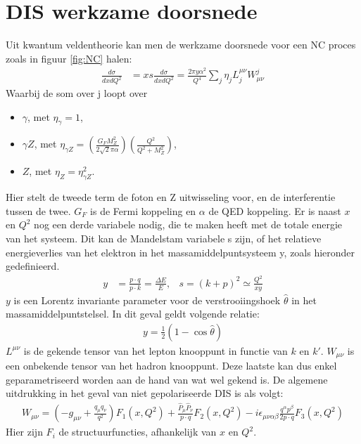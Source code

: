 \documentclass[a4paper,11pt]{article}
\numberwithin{equation}{section} %
\begin{document}
\section{DIS werkzame doorsnede} \label{app:SF}
Uit kwantum veldentheorie kan men de werkzame doorsnede voor een NC proces zoals in figuur \ref{fig:NC} halen:
\begin{align}
\frac{d\sigma}{dxdQ^2} &= xs \frac{d\sigma}{dxdQ^2} = \frac{2\pi y \alpha^2}{Q^4} \sum_j \eta_j L_j^{\mu \nu} W_{\mu \nu}^j
\end{align}
Waarbij de som over j loopt over
\begin{itemize}
  \item $\gamma$, met $\eta_\gamma=1$,
  \item $\gamma Z$, met $\eta_{\gamma Z} = \left( \frac{G_F M_Z^2}{2\sqrt{2}\pi \alpha} \right) \left(\frac{Q^2}{Q^2+M_Z^2} \right)$,
  \item $Z$, met $\eta_Z = \eta_{\gamma Z}^2$.
\end{itemize}
Hier stelt de tweede term de foton en Z uitwisseling voor, en de interferentie tussen de twee. $G_F$ is de Fermi koppeling en $\alpha$ de QED koppeling.
Er is naast $x$ en $Q^2$ nog een derde variabele nodig, die te maken heeft met de totale energie van het systeem.
Dit kan de Mandelstam variabele s zijn, of het relatieve energieverlies van het elektron in het massamiddelpuntsysteem y, zoals hieronder gedefinieerd.
\begin{align}
y &= \frac{p \cdot q}{p \cdot k} = \frac{\Delta E}{E} ,& s = (k+p)^2 \simeq \frac{Q^2}{xy}
\end{align}
$y$ is een Lorentz invariante parameter voor de verstrooiingshoek $\hat{\theta}$ in het massamiddelpuntstelsel.
In dit geval geldt volgende relatie:
\begin{align}
y = \frac{1}{2} \left( 1-\cos{\hat{\theta}} \right)
\end{align}
$L^{\mu \nu}$ is de gekende tensor van het lepton knooppunt in functie van $k$ en $k'$.
$W_{\mu \nu}$ is een onbekende tensor van het hadron knooppunt.
Deze laatste kan dus enkel geparametriseerd worden aan de hand van wat wel gekend is.
De algemene uitdrukking in het geval van niet gepolariseerde DIS is als volgt:
\begin{align}
W_{\mu \nu} = \left( -g_{\mu \nu} + \frac{q_\mu q_\nu}{q^2} \right) F_1(x,Q^2) + \frac{\hat{P}_\mu \hat{P}_\nu}{p \cdot q} F_2(x,Q^2) -  i\epsilon_{\mu \nu \alpha \beta} \frac{q^\alpha p^\beta}{2p \cdot q} F_3(x,Q^2)
\end{align}
Hier zijn $F_i$ de structuurfuncties, afhankelijk van $x$ en $Q^2$.
\end{document}
